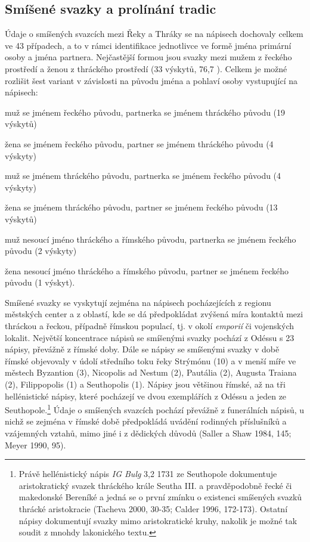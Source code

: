 \subsection[smíšené-svazky-a-prolínání-tradic]{Smíšené svazky a prolínání tradic}

Údaje o smíšených svazcích mezi Řeky a Thráky se na nápisech dochovaly celkem ve 43 případech, a to v rámci identifikace jednotlivce ve formě jména primární osoby a jména partnera. Nejčastější formou jsou svazky mezi mužem z řeckého prostředí a ženou z thráckého prostředí (33 výskytů, 76,7 ). Celkem je možné rozlišit šest variant v závislosti na původu jména a pohlaví osoby vystupující na nápisech:

\startitemize[A][stopper=.]
\item
  \startblockquote
  muž se jménem řeckého původu, partnerka se jménem thráckého původu (19 výskytů)
  \stopblockquote
\item
  \startblockquote
  žena se jménem řeckého původu, partner se jménem thráckého původu (4 výskyty)
  \stopblockquote
\item
  \startblockquote
  muž se jménem thráckého původu, partnerka se jménem řeckého původu (4 výskyty)
  \stopblockquote
\item
  \startblockquote
  žena se jménem thráckého původu, partner se jménem řeckého původu (13 výskytů)
  \stopblockquote
\item
  \startblockquote
  muž nesoucí jméno thráckého a římského původu, partnerka se jménem řeckého původu (2 výskyty)
  \stopblockquote
\item
  \startblockquote
  žena nesoucí jméno thráckého a římského původu, partner se jménem řeckého původu (1 výskyt).
  \stopblockquote
\stopitemize

Smíšené svazky se vyskytují zejména na nápisech pocházejících z regionu městských center a z oblastí, kde se dá předpokládat zvýšená míra kontaktů mezi thráckou a řeckou, případně římskou populací, tj. v okolí {\em emporií} či vojenských lokalit. Největší koncentrace nápisů se smíšenými svazky pochází z Odéssu s 23 nápisy, převážně z římské doby. Dále se nápisy se smíšenými svazky v době římské objevovaly v údolí středního toku řeky Strýmónu (10) a v menší míře ve městech Byzantion (3), Nicopolis ad Nestum (2), Pautália (2), Augusta Traiana (2), Filippopolis (1) a Seuthopolis (1). Nápisy jsou většinou římské, až na tři hellénistické nápisy, které pocházejí ve dvou exemplářích z Odéssu a jeden ze Seuthopole.\footnote{Právě hellénistický nápis {\em IG Bulg} 3,2 1731 ze Seuthopole dokumentuje aristokratický svazek thráckého krále Seutha III. a pravděpodobně řecké či makedonské Bereníké a jedná se o první zmínku o existenci smíšených svazků thrácké aristokracie (Tacheva 2000, 30-35; Calder 1996, 172-173). Ostatní nápisy dokumentují svazky mimo aristokratické kruhy, nakolik je možné tak soudit z mnohdy lakonického textu.} Údaje o smíšených svazcích pochází převážně z funerálních nápisů, u nichž se zejména v římské době předpokládá uvádění rodinných příslušníků a vzájemných vztahů, mimo jiné i z dědických důvodů (Saller a Shaw 1984, 145; Meyer 1990, 95).

